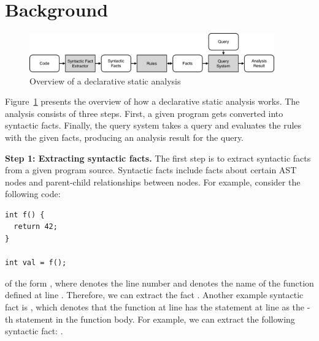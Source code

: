 \section{Background}\label{sec:background} 
\begin{figure}[t]
  \centering
  \vspace{2mm}
  \includegraphics[width=0.94\textwidth]{img/ov1.pdf}
  \caption{Overview of a declarative static analysis}
  \label{fig:ov1}
\end{figure}

Figure~\ref{fig:ov1} presents the overview of how a declarative static
analysis works.  The analysis consists of three steps.  First, a given program
gets converted into syntactic facts.   Finally,
the query system takes a query and evaluates the rules with the
given facts, producing an analysis result for the query. 


\textbf{Step 1: Extracting syntactic facts.}
The first step is to extract syntactic facts from a given program source.
Syntactic facts include facts about certain AST nodes and
parent-child relationships between nodes. For example, consider
the following code:

\begin{lstlisting}[style=mcpp]
int f() {
  return 42;
}

int val = f();
\end{lstlisting}
 of the form , where
 denotes the line number and  denotes the name of the function
defined at line .  Therefore, we can extract the fact .  Another example syntactic fact is , which denotes that the function at line  has the statement
at line  as the -th statement in the function body.  For
example, we can extract the following syntactic fact: .

